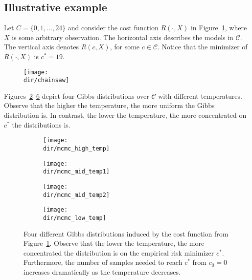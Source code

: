 \subsection{Illustrative example}

Let $C = \{0, 1, \ldots, 24\}$ and consider the cost function $R(\cdot, X)$ in Figure~\ref{fig:chainsaw_sa},
where $X$ is some arbitrary observation. The horizontal axis describes the
models in $\mathcal{C}$. The vertical axis denotes $R(c, X)$, for some $c \in \mathcal{C}$. Notice
that the minimizer of $R(\cdot, X)$ is $c^* = 19$.

\begin{figure}
\centering
\texttt{[image: \\dir/chainsaw]}
\caption{}
\label{fig:chainsaw_sa}
\end{figure}

Figures~\ref{fig:mcmc_high_temp}--\ref{fig:mcmc_low_temp} depict four Gibbs distributions over $\mathcal{C}$ with different
temperatures. Observe that the higher the temperature, the more uniform
the Gibbs distribution is. In contrast, the lower the temperature, the more
concentrated on $c^*$ the distributions is.

\begin{figure}
    \centering
    \begin{subfigure}[b]{0.6\textwidth}
        \texttt{[image: \\dir/mcmc\_high\_temp]}
        \caption{}
        \label{fig:mcmc_high_temp}
    \end{subfigure}

    \begin{subfigure}[b]{0.6\textwidth}
        \texttt{[image: \\dir/mcmc\_mid\_temp1]}
        \caption{}
        \label{fig:mcmc_mid1_temp}
    \end{subfigure}
    
    \begin{subfigure}[b]{0.6\textwidth}
        \texttt{[image: \\dir/mcmc\_mid\_temp2]}
        \caption{}
        \label{fig:mcmc_mid2_temp}
    \end{subfigure}

    \begin{subfigure}[b]{0.6\textwidth}
        \texttt{[image: \\dir/mcmc\_low\_temp]}
        \caption{}
        \label{fig:mcmc_low_temp}
    \end{subfigure}
    \caption{Four different Gibbs distributions induced by the cost function
from Figure~\ref{fig:chainsaw_sa}. Observe that the lower the temperature, the more
concentrated the distribution is on the empirical risk minimizer $c^*$. Furthermore,
the number of samples needed to reach $c^*$ from $c_0 = 0$ increases
dramatically as the temperature decreases.}
\end{figure}

